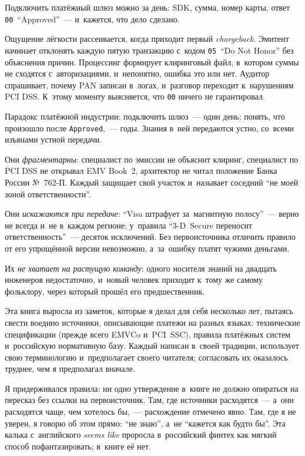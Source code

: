 

Подключить платёжный шлюз можно за день: SDK, сумма, номер карты, ответ
\texttt{00}~\enquote{Approved}~--- и~кажется, что дело сделано.

Ощущение лёгкости рассеивается, когда приходит первый \textit{chargeback}.
Эмитент начинает отклонять каждую пятую транзакцию с~кодом
\texttt{05}~\enquote{Do Not Honor} без объяснения причин. Процессинг формирует
клиринговый файл, в~котором суммы не сходятся с~авторизациями, и~непонятно,
ошибка это или нет. Аудитор спрашивает, почему PAN записан в~логах, и~разговор
переходит к~нарушениям PCI DSS. К~этому моменту выясняется, что \texttt{00} ничего
не гарантировал.

Парадокс платёжной индустрии: подключить шлюз~--- один день; понять, что
произошло после \texttt{Approved},~--- годы. Знания в~ней передаются устно,
со~всеми изъянами устной передачи.

Они \textit{фрагментарны}: специалист по эмиссии не объяснит клиринг,
специалист по PCI DSS не открывал EMV Book~2, архитектор не читал положение
Банка России №~762-П. Каждый защищает свой участок и~называет соседний
\enquote{не моей зоной ответственности}.

Они \textit{искажаются при передаче}: \enquote{Visa штрафует за~магнитную
полосу}~--- верно не всегда и~не в~каждом регионе; у~правила \enquote{3-D~Secure
переносит ответственность}~--- десяток исключений. Без первоисточника отличить
правило от его упрощённой версии невозможно, а~за~ошибку платят чужими
деньгами.

Их \textit{не хватает на растущую команду}: одного носителя знаний на двадцать
инженеров недостаточно, и~новый человек приходит к~тому же самому фольклору,
через который прошёл его предшественник.

Эта книга выросла из заметок, которые я делал для себя несколько лет, пытаясь
свести воедино источники, описывающие платежи на разных языках:
технические спецификации (прежде всего EMVCo и~PCI~SSC), правила платёжных
систем и~российскую нормативную базу. Каждый написан в~своей традиции,
использует свою терминологию и~предполагает своего читателя; согласовать их
оказалось труднее, чем я предполагал вначале.

Я придерживался правила: ни одно утверждение в~книге не должно опираться
на пересказ без ссылки на первоисточник. Там, где источники расходятся~---
а~они расходятся чаще, чем хотелось бы,~--- расхождение отмечено явно. Там, где
я не уверен, я говорю об этом прямо: \enquote{не знаю}, а~не \enquote{кажется
как будто бы}. Эта калька с~английского \textit{seems like} проросла
в~российский финтех как мягкий способ пофантазировать; в~книге её нет.

